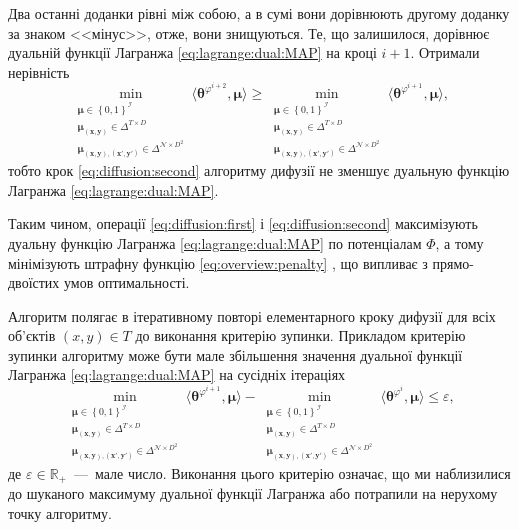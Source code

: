 Два останні доданки рівні між собою,
а в сумі вони дорівнюють другому доданку за знаком <<мінус>>, отже,
вони знищуються.
Те, що залишилося,
дорівнює дуальній функції Лагранжа \eqref{eq:lagrange:dual:MAP}
на кроці $i + 1$.
Отримали нерівність
\begin{equation*}
    \min \limits_{\substack{\pmb{\mu} \in \left\{ 0, 1 \right\}^{\mathcal{I}} \\
                            \pmb{\mu_{\left(x, y \right)}} \in \Delta^{T \times D} \\
                            \pmb{\mu_{\left(x, y \right), \left(x', y' \right)}} \in
                                \Delta^{\mathcal{N} \times D^2}}}
        \langle \pmb{\theta}^{\varphi^{i + 2}}, \pmb{\mu} \rangle \ge
    \min \limits_{\substack{\pmb{\mu} \in \left\{ 0, 1 \right\}^{\mathcal{I}} \\
                            \pmb{\mu_{\left(x, y \right)}} \in \Delta^{T \times D} \\
                            \pmb{\mu_{\left(x, y \right), \left(x', y' \right)}} \in
                                \Delta^{\mathcal{N} \times D^2}}}
        \langle \pmb{\theta}^{\varphi^{i + 1}}, \pmb{\mu} \rangle,
\end{equation*}
тобто крок \eqref{eq:diffusion:second}
алгоритму дифузії не зменшує дуальную функцію Лагранжа
\eqref{eq:lagrange:dual:MAP}.

Таким чином,
операції \eqref{eq:diffusion:first} і
\eqref{eq:diffusion:second} максимізують дуальну функцію Лагранжа
\eqref{eq:lagrange:dual:MAP} по потенціалам
$\Phi$, а тому мінімізують штрафну функцію \eqref{eq:overview:penalty}
\cite{overview:savchynskyy:diffusion},
що випливає з прямо-двоїстих умов оптимальності.

Алгоритм полягає в ітеративному повторі елементарного кроку дифузії для всіх об'єктів
$\left(x, y \right) \in T$ до виконання критерію зупинки.
Прикладом критерію зупинки алгоритму може бути мале збільшення
значення дуальної функції Лагранжа \eqref{eq:lagrange:dual:MAP}
на сусідніх ітераціях
\begin{equation*}
    \min \limits_{\substack{\pmb{\mu} \in \left\{ 0, 1 \right\}^{\mathcal{I}} \\
                            \pmb{\mu_{\left(x, y \right)}} \in \Delta^{T \times D} \\
                            \pmb{\mu_{\left(x, y \right), \left(x', y' \right)}} \in
                                \Delta^{\mathcal{N} \times D^2}}}
        \langle \pmb{\theta}^{\varphi^{i + 1}}, \pmb{\mu} \rangle -
    \min \limits_{\substack{\pmb{\mu} \in \left\{ 0, 1 \right\}^{\mathcal{I}} \\
                            \pmb{\mu_{\left(x, y \right)}} \in \Delta^{T \times D} \\
                            \pmb{\mu_{\left(x, y \right), \left(x', y' \right)}} \in
                                \Delta^{\mathcal{N} \times D^2}}}
        \langle \pmb{\theta}^{\varphi^i}, \pmb{\mu} \rangle \le \varepsilon,
\end{equation*}
де $\varepsilon \in \mathbb{R}_+$~---~мале число.
Виконання цього критерію означає,
що ми наблизилися до шуканого максимуму дуальної функції Лагранжа
або потрапили на нерухому точку алгоритму.

